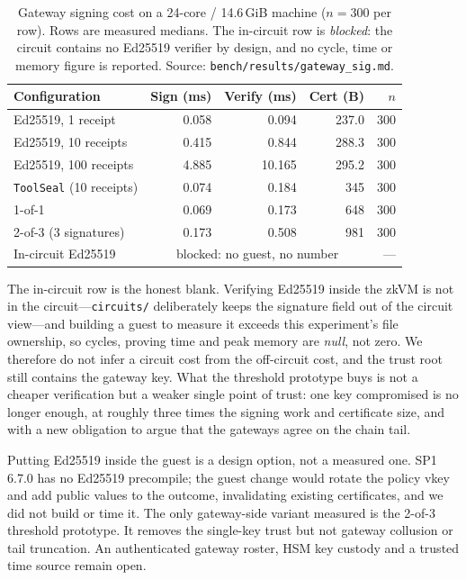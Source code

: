 \documentclass[10pt,journal,compsoc]{IEEEtran}
\newcommand{\tabfont}{\footnotesize}
\begin{document}
\begin{table}[t]
\centering
\caption{Gateway signing cost on a 24-core / 14.6\,GiB machine ($n=300$ per
row). Rows are measured medians. The in-circuit row is \emph{blocked}: the
circuit contains no Ed25519 verifier by design, and no cycle, time or memory
figure is reported. Source: \texttt{bench/results/gateway\_sig.md}.}
\label{tab:gateway}
\tabfont
\begin{tabular}{@{}lrrrr@{}}
\toprule
Configuration & Sign (ms) & Verify (ms) & Cert (B) & $n$ \\
\midrule
Ed25519, 1 receipt & 0.058 & 0.094 & 237.0 & 300 \\
Ed25519, 10 receipts & 0.415 & 0.844 & 288.3 & 300 \\
Ed25519, 100 receipts & 4.885 & 10.165 & 295.2 & 300 \\
\texttt{ToolSeal} (10 receipts) & 0.074 & 0.184 & 345 & 300 \\
1-of-1 & 0.069 & 0.173 & 648 & 300 \\
2-of-3 (3 signatures) & 0.173 & 0.508 & 981 & 300 \\
\midrule
In-circuit Ed25519 & \multicolumn{3}{c}{blocked: no guest, no number} & --- \\
\bottomrule
\end{tabular}
\end{table}

The in-circuit row is the honest blank. Verifying Ed25519 inside the zkVM is not
in the circuit---\texttt{circuits/} deliberately keeps the signature field out
of the circuit view---and building a guest to measure it exceeds this
experiment's file ownership, so cycles, proving time and peak memory are
\emph{null}, not zero. We therefore do not infer a circuit cost from the
off-circuit cost, and the trust root still contains the gateway key. What the
threshold prototype buys is not a cheaper verification but a weaker single point
of trust: one key compromised is no longer enough, at roughly three times the
signing work and certificate size, and with a new obligation to argue that the
gateways agree on the chain tail.

Putting Ed25519 inside the guest is a design option, not a measured one. SP1
6.7.0 has no Ed25519 precompile; the guest change would rotate the policy vkey
and add public values to the outcome, invalidating existing certificates, and we
did not build or time it. The only gateway-side variant measured is the 2-of-3
threshold prototype. It removes the single-key trust but not gateway collusion
or tail truncation. An authenticated gateway roster, HSM key custody and a
trusted time source remain open.
\end{document}

